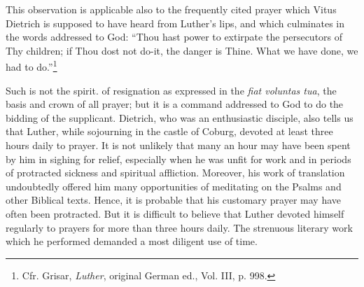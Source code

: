This observation is applicable also to the frequently cited prayer
which Vitus Dietrich is supposed to have heard from Luther’s lips,
and which culminates in the words addressed to God: “Thou hast
power to extirpate the persecutors of Thy children; if Thou dost not
do-it, the danger is Thine. What we have done, we had to do.”\footnote{Cfr. Grisar, \textit{Luther}, original German ed., Vol. III, p. 998.}

Such is not the spirit. of resignation as expressed in the \textit{fiat voluntas
tua}, the basis and crown of all prayer; but it is a command addressed
to God to do the bidding of the supplicant. Dietrich, who was an
enthusiastic disciple, also tells us that Luther, while sojourning in the
castle of Coburg, devoted at least three hours daily to prayer. It is
not unlikely that many an hour may have been spent by him in sighing for
relief, especially when he was unfit for work and in periods
of protracted sickness and spiritual affliction. Moreover, his work of
translation undoubtedly offered him many opportunities of meditating on
the Psalms and other Biblical texts. Hence, it is probable that
his customary prayer may have often been protracted. But it is difficult
to believe that Luther devoted himself regularly to prayers for
more than three hours daily. The strenuous literary work which he
performed demanded a most diligent use of time.
